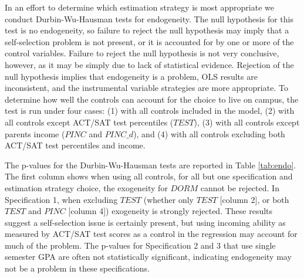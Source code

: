 \documentclass[12pt]{article}
\begin{document}
In an effort to determine which estimation strategy is most appropriate we conduct Durbin-Wu-Hausman tests for endogeneity.  The null hypothesis for this test is no endogeneity, so failure to reject the null hypothesis may imply that a self-selection problem is not present, or it is accounted for by one or more of the control variables.  Failure to reject the null hypothesis is not very conclusive, however, as it may be simply due to lack of statistical evidence.  Rejection of the null hypothesis implies that endogeneity is a problem, OLS results are inconsistent, and the instrumental variable strategies are more appropriate.  To determine how well the controls can account for the choice to live on campus, the test is run under four cases: (1) with all controls included in the model, (2) with all controls except ACT/SAT test percentiles ($TEST$), (3) with all controls except parents income ($PINC$ and $PINC\_d$), and (4) with all controls excluding both ACT/SAT test percentiles and income.  

The p-values for the Durbin-Wu-Hausman tests are reported in Table \ref{tab:endo}.  The first column shows when using all controls, for all but one specification and estimation strategy choice, the exogeneity for $DORM$ cannot be rejected.  In Specification 1, when excluding $TEST$ (whether only $TEST$ [column 2], or both $TEST$ and $PINC$ [column 4]) exogeneity is strongly rejected.  These results suggest a self-selection issue is certainly present, but using incoming ability as measured by ACT/SAT test scores as a control in the regression may account for much of the problem.  The p-values for Specification 2 and 3 that use single semester GPA are often not statistically significant, indicating endogeneity may not be a problem in these specifications.
\end{document}

